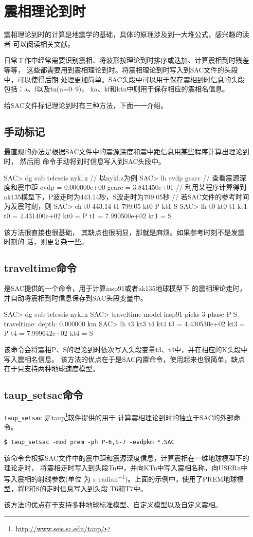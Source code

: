 \section{震相理论到时}
震相理论到时的计算是地震学的基础，具体的原理涉及到一大堆公式，感兴趣的读者
可以阅读相关文献。

日常工作中经常需要识别震相、将波形按理论到时排序或迭加、计算震相到时残差等等，
这些都需要用到震相理论到时。将震相理论到时写入到SAC文件的头段中，可以使得后期
处理更加简单。SAC头段中可以用于保存震相到时信息的头段包括：a、f以及tn(n=0--9)，
ka、kf和ktn中则用于保存相应的震相名信息。

给SAC文件标记理论到时有三种方法，下面一一介绍。

\subsection{手动标记}
最直观的办法是根据SAC文件中的震源深度和震中距信息用某些程序计算出理论到时，
然后用  命令手动将到时信息写入到SAC头段中。
\begin{SACCode}
SAC> dg sub teleseis nykl.z     // 以nykl.z为例
SAC> lh evdp gcarc              // 查看震源深度和震中距
     evdp = 0.000000e+00
    gcarc = 3.841450e+01
// 利用某程序计算得到ak135模型下，P波走时为443.14秒，S波走时为799.05秒
// 若SAC文件的参考时间为发震时刻，则
SAC> ch t0 443.14 t1 799.05 kt0 P kt1 S
SAC> lh t0 kt0 t1 kt1
     t0 = 4.431400e+02
    kt0 = P
     t1 = 7.990500e+02
    kt1 = S
\end{SACCode}
该方法很直接也很基础， 其缺点也很明显，那就是麻烦。如果参考时刻不是发震时刻的
话，则更复杂一些。

\subsection{traveltime命令}
 是SAC提供的一个命令，用于计算iasp91或者ak135地球模型下
的震相理论走时，并自动将震相到时信息保存到SAC头段变量中。
\begin{SACCode}
SAC> dg sub teleseis nykl.z
SAC> traveltime model iasp91 picks 3 phase P S
traveltime: depth: 0.000000 km
SAC> lh t3 kt3 t4 kt4
         t3 = 4.430530e+02
        kt3 = P
         t4 = 7.999642e+02
        kt4 = S
\end{SACCode}
该命令会将震相P、S的理论到时依次写入头段变量t3、t4中，并在相应的K头段中写入震相名信息。
该方法的优点在于是SAC内置命令，使用起来也很简单，缺点在于只支持两种地球速度模型。

\subsection{taup\texttt{\_}setsac命令}
\verb|taup_setsac| 是taup\footnote{\url{http://www.seis.sc.edu/taup/}}软件提供的用于
计算震相理论到时的独立于SAC的外部命令。
\begin{verbatim}
$ taup_setsac -mod prem -ph P-6,S-7 -evdpkm *.SAC
\end{verbatim}
该命令会根据SAC文件中的震中距和震源深度信息，计算震相在一维地球模型下的理论走时，
将震相走时写入到头段Tn中，并向KTn中写入震相名称，向USERn中写入震相的射线参数(单位
为 \si{\s\per radian})。上面的示例中，使用了PREM地球模型，将P和S的走时信息写入到头段
T6和T7中。

该方法的优点在于支持多种地球标准模型、自定义模型以及自定义震相。
